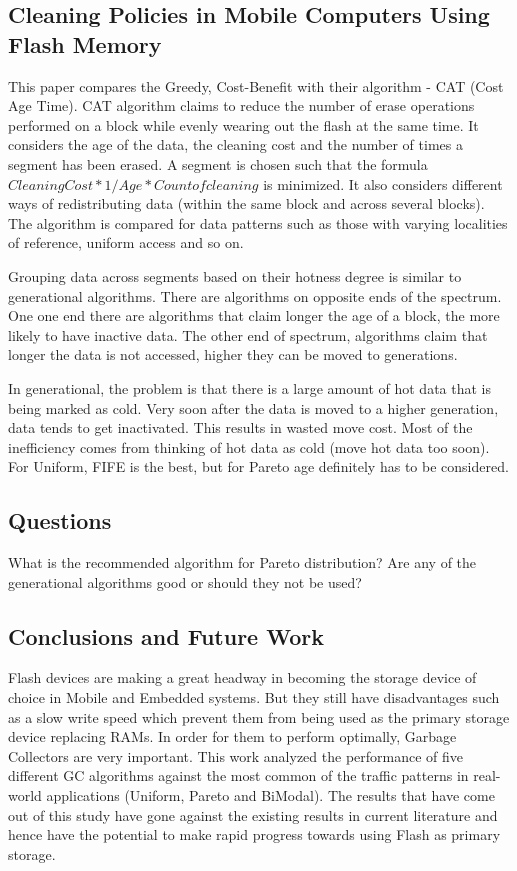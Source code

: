 \subsection{Cleaning Policies in Mobile Computers Using Flash Memory}
	This paper compares the Greedy, Cost-Benefit with their algorithm - CAT (Cost Age Time). CAT algorithm claims to reduce the number of erase operations performed on a block while evenly wearing out the flash at the same time. It considers the age of the data, the cleaning cost and the number of times a segment has been erased. A segment is chosen such that the formula $CleaningCost * 1/Age * Count of cleaning$ is minimized. It also considers different ways of redistributing data (within the same block and across several blocks). The algorithm is compared for data patterns such as those with varying localities of reference, uniform access and so on.

	Grouping data across segments based on their hotness degree is similar to generational algorithms. There are algorithms on opposite ends of the spectrum. One one end there are algorithms that claim longer the age of a block, the more likely to have inactive data. The other end of spectrum, algorithms claim that longer the data is not accessed, higher they can be moved to generations.

In generational, the problem is that there is a large amount of hot data that is being marked as cold. Very soon after the data is moved to a higher generation, data tends to get inactivated. This results in wasted move cost. Most of the inefficiency comes from thinking of hot data as cold (move hot data too soon). For Uniform, FIFE is the best, but for Pareto age definitely has to be considered. 

\subsection{Questions}
	What is the recommended algorithm for Pareto distribution? 
	Are any of the generational algorithms good or should they not be used?

\subsection*{Conclusions and Future Work}
	Flash devices are making a great headway in becoming the storage device of choice in Mobile and Embedded systems. But they still have disadvantages such as a slow write speed which prevent them from being used as the primary storage device replacing RAMs. In order for them to perform optimally, Garbage Collectors are very important. This work analyzed the performance of five different GC algorithms against the most common of the traffic patterns in real-world applications (Uniform, Pareto and BiModal). The results that have come out of this study have gone against the existing results in current literature and hence have the potential to make rapid progress towards using Flash as primary storage. 

